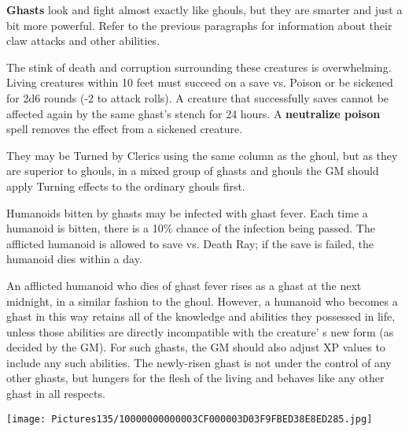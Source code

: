 \documentclass[a4paper,twoside,openany,10pt]{book}
\begin{document}
\begin{multicols}{2}
\textbf{Ghasts} look and fight almost exactly like ghouls, but they are smarter and just a bit more powerful. Refer to the previous paragraphs for information about their claw attacks and other abilities.

The stink of death and corruption surrounding these creatures is overwhelming. Living creatures within 10 feet must succeed on a save vs. Poison or be sickened for 2d6 rounds (-2 to attack rolls). A creature that successfully saves cannot be affected again by the same ghast's stench for 24 hours. A \textbf{neutralize poison} spell removes the effect from a sickened creature.

They may be Turned by Clerics using the same column as the ghoul, but as they are superior to ghouls, in a mixed group of ghasts and ghouls the GM should apply Turning effects to the ordinary ghouls first.

Humanoids bitten by ghasts may be infected with ghast fever. Each time a humanoid is bitten, there is a 10\% chance of the infection being passed. The afflicted humanoid is allowed to save vs. Death Ray; if the save is failed, the humanoid dies within a day.

An afflicted humanoid who dies of ghast fever rises as a ghast at the next midnight, in a similar fashion to the ghoul. However, a humanoid who becomes a ghast in this way retains all of the knowledge and abilities they possessed in life, unless those abilities are directly incompatible with the creature' s new form (as decided by the GM). For such ghasts, the GM should also adjust XP values to include any such abilities. The newly-risen ghast is not under the control of any other ghasts, but hungers for the flesh of the living and behaves like any other ghast in all respects.

\end{multicols}

\begin{center}
	\texttt{[image: Pictures135/10000000000003CF000003D03F9FBED38E8ED285.jpg]}
\end{center}
\end{document}
